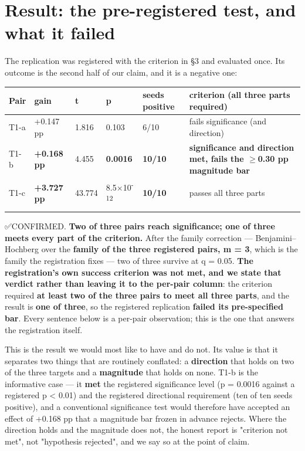 \documentclass[pdflatex,sn-mathphys-ay]{sn-jnl}
\begin{document}
\section{Result: the pre-registered test, and what it failed}%

The replication was registered with the criterion in \S{}3 and evaluated once. Its outcome is the second half of our claim, and it is a negative one:

{\footnotesize
\setlength{\tabcolsep}{4pt}
\begin{longtable}{p{}p{}p{}p{}p{}p{}}
\toprule
Pair & gain & t & p & seeds positive & criterion (all three parts required) \\
\midrule
\endhead
T1-a & +0.147 pp & 1.816 & 0.103 & 6/10 & fails significance (and direction) \\
T1-b & \textbf{+0.168 pp} & 4.455 & \textbf{0.0016} & \textbf{10/10} & \textbf{significance and direction met, fails the \ensuremath{\geq}0.30 pp magnitude bar} \\
T1-c & \textbf{+3.727 pp} & 43.774 & 8.5\ensuremath{\times}10\textsuperscript{-12} & \textbf{10/10} & passes all three parts \\
\botrule
\end{longtable}}

✅CONFIRMED. \textbf{Two of three pairs reach significance; one of three meets every part of the criterion.} After the family correction --- Benjamini--Hochberg over the \textbf{family of the three registered pairs, m = 3}, which is the family the registration fixes --- two of three survive at q = 0.05. \textbf{The registration's own success criterion was not met, and we state that verdict rather than leaving it to the per-pair column}: the criterion required \textbf{at least two of the three pairs to meet all three parts}, and the result is \textbf{one of three}, so the registered replication \textbf{failed its pre-specified bar}. Every sentence below is a per-pair observation; this is the one that answers the registration itself.

This is the result we would most like to have and do not. Its value is that it separates two things that are routinely conflated: a \textbf{direction} that holds on two of the three targets and a \textbf{magnitude} that holds on none. T1-b is the informative case --- it \textbf{met} the registered significance level (p = 0.0016 against a registered p \textless{} 0.01) and the registered directional requirement (ten of ten seeds positive), and a conventional significance test would therefore have accepted an effect of +0.168 pp that a magnitude bar frozen in advance rejects. Where the direction holds and the magnitude does not, the honest report is "criterion not met", not "hypothesis rejected", and we say so at the point of claim.
\end{document}
